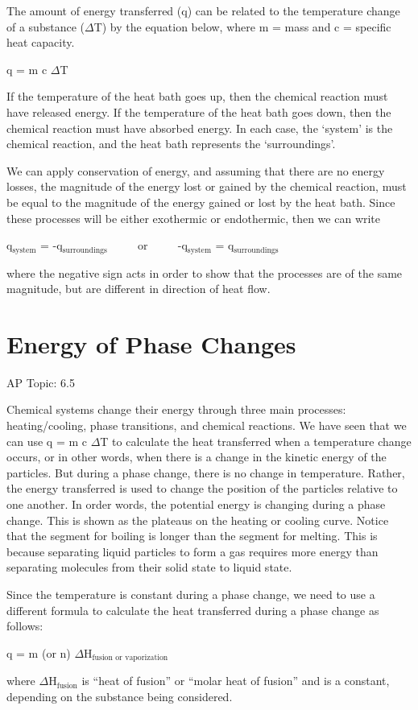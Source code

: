 \documentclass[../chem.tex]{subfiles}
\begin{document}
The amount of energy transferred (q) can be related to the temperature change of a substance ($\Delta$T) by the equation below, where m = mass and c = specific heat capacity.
\begin{center}
    q = m c $\Delta$T
\end{center}

If the temperature of the heat bath goes up, then the chemical reaction must have released energy. If the temperature of the heat bath goes down, then the 
chemical reaction must have absorbed energy. In each case, the `system' is the chemical reaction, and the heat bath represents the `surroundings'.

We can apply conservation of energy, and assuming that there are no energy losses, the magnitude of the energy lost or gained by the chemical reaction, must be equal to the magnitude of the energy gained 
or lost by the heat bath. Since these processes will be either exothermic or endothermic, then we can write 
\begin{center}
    q$_{\text{system}}$ = -q$_{\text{surroundings}}$ $\qquad$ or $\qquad$ -q$_{\text{system}}$ = q$_{\text{surroundings}}$
\end{center}
where the negative sign acts in order to show that the processes are of the same magnitude, but are different in direction of heat flow.

\section{Energy of Phase Changes}
AP Topic: 6.5

Chemical systems change their energy through three main processes: heating/cooling, phase transitions, and chemical reactions. We have seen that we can use q = m c $\Delta$T to calculate the 
heat transferred when a temperature change occurs, or in other words, when there is a change in the kinetic energy of the particles. But during a phase change,
there is no change in temperature. Rather, the energy transferred is used to change the position of the particles relative to one another. In order words, 
the potential energy is changing during a phase change. This is shown as the plateaus on the heating or cooling curve. Notice that the segment for boiling is longer than 
the segment for melting. This is because separating liquid particles to form a gas requires more energy than separating molecules from their solid state to liquid state.

Since the temperature is constant during a phase change, we need to use a different formula to calculate the heat transferred during a phase change as follows:
\begin{center}
    q = m (or n) $\Delta$H$_{\text{fusion or vaporization}}$
\end{center}
where $\Delta$H$_{\text{fusion}}$ is ``heat of fusion'' or ``molar heat of fusion'' and is a constant, depending on the substance being considered.
\end{document}
